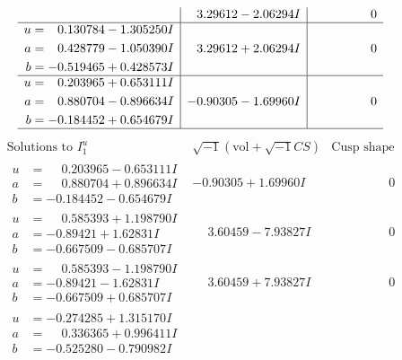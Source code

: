 \documentclass[1p]{elsarticle_modified}
\theoremstyle{definition}
\newcommand{\I}{\sqrt{-1}}
\begin{document}
$$\begin{array}{c|c|c}
 & \phantom{-}3.29612 - 2.06294 I & \phantom{-0.000000 } 0 \\ \hline\begin{aligned}
u &= \phantom{-}0.130784 - 1.305250 I \\
a &= \phantom{-}0.428779 - 1.050390 I \\
b &= -0.519465 + 0.428573 I\end{aligned}
 & \phantom{-}3.29612 + 2.06294 I & \phantom{-0.000000 } 0 \\ \hline\begin{aligned}
u &= \phantom{-}0.203965 + 0.653111 I \\
a &= \phantom{-}0.880704 - 0.896634 I \\
b &= -0.184452 + 0.654679 I\end{aligned}
 & -0.90305 - 1.69960 I & \phantom{-0.000000 } 0\\
 \hline 
 \end{array}$$\newpage$$\begin{array}{c|c|c}  
\text{Solutions to }I^u_{1}& \I (\text{vol} + \sqrt{-1}CS) & \text{Cusp shape}\\
 \hline 
\begin{aligned}
u &= \phantom{-}0.203965 - 0.653111 I \\
a &= \phantom{-}0.880704 + 0.896634 I \\
b &= -0.184452 - 0.654679 I\end{aligned}
 & -0.90305 + 1.69960 I & \phantom{-0.000000 } 0 \\ \hline\begin{aligned}
u &= \phantom{-}0.585393 + 1.198790 I \\
a &= -0.89421 + 1.62831 I \\
b &= -0.667509 - 0.685707 I\end{aligned}
 & \phantom{-}3.60459 - 7.93827 I & \phantom{-0.000000 } 0 \\ \hline\begin{aligned}
u &= \phantom{-}0.585393 - 1.198790 I \\
a &= -0.89421 - 1.62831 I \\
b &= -0.667509 + 0.685707 I\end{aligned}
 & \phantom{-}3.60459 + 7.93827 I & \phantom{-0.000000 } 0 \\ \hline\begin{aligned}
u &= -0.274285 + 1.315170 I \\
a &= \phantom{-}0.336365 + 0.996411 I \\
b &= -0.525280 - 0.790982 I\end{aligned}

\end{array}$$
\end{document}
